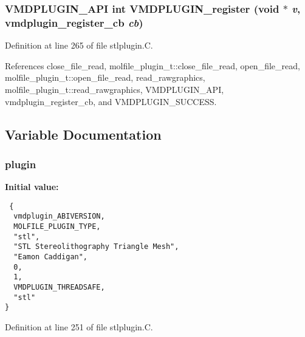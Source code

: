 \subsubsection{\setlength{\rightskip}{0pt plus 5cm}VMDPLUGIN\_\-API int VMDPLUGIN\_\-register (void $\ast$ {\em v}, {\bf vmdplugin\_\-register\_\-cb} {\em cb})}\label{stlplugin_8C_a7}




Definition at line 265 of file stlplugin.C.

References close\_\-file\_\-read, molfile\_\-plugin\_\-t::close\_\-file\_\-read, open\_\-file\_\-read, molfile\_\-plugin\_\-t::open\_\-file\_\-read, read\_\-rawgraphics, molfile\_\-plugin\_\-t::read\_\-rawgraphics, VMDPLUGIN\_\-API, vmdplugin\_\-register\_\-cb, and VMDPLUGIN\_\-SUCCESS.

\subsection{Variable Documentation}
\subsubsection{ plugin\hspace{0.3cm}{\tt  [static]}}\label{stlplugin_8C_a1}


{\bf Initial value:}

\footnotesize\begin{verbatim} {
  vmdplugin_ABIVERSION,   
  MOLFILE_PLUGIN_TYPE,    
  "stl",                  
  "STL Stereolithography Triangle Mesh", 
  "Eamon Caddigan",       
  0,                      
  1,                      
  VMDPLUGIN_THREADSAFE,   
  "stl"                   
}\end{verbatim}\normalsize 


Definition at line 251 of file stlplugin.C.